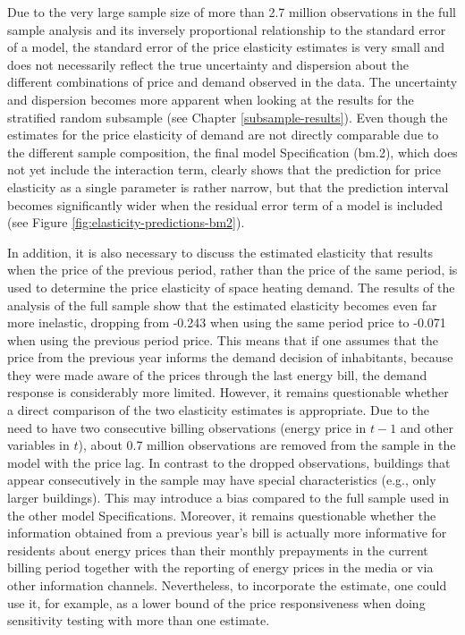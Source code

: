 \documentclass[12pt,twoside]{reedthesis}
\begin{document}
Due to the very large sample size of more than 2.7 million observations in the full sample analysis and its inversely proportional relationship to the standard error of a model, the standard error of the price elasticity estimates is very small and does not necessarily reflect the true uncertainty and dispersion about the different combinations of price and demand observed in the data. The uncertainty and dispersion becomes more apparent when looking at the results for the stratified random subsample (see Chapter \ref{subsample-results}). Even though the estimates for the price elasticity of demand are not directly comparable due to the different sample composition, the final model Specification (bm.2), which does not yet include the interaction term, clearly shows that the prediction for price elasticity as a single parameter is rather narrow, but that the prediction interval becomes significantly wider when the residual error term of a model is included (see Figure \ref{fig:elasticity-predictions-bm2}).

In addition, it is also necessary to discuss the estimated elasticity that results when the price of the previous period, rather than the price of the same period, is used to determine the price elasticity of space heating demand. The results of the analysis of the full sample show that the estimated elasticity becomes even far more inelastic, dropping from -0.243 when using the same period price to -0.071 when using the previous period price. This means that if one assumes that the price from the previous year informs the demand decision of inhabitants, because they were made aware of the prices through the last energy bill, the demand response is considerably more limited. However, it remains questionable whether a direct comparison of the two elasticity estimates is appropriate. Due to the need to have two consecutive billing observations (energy price in \(t-1\) and other variables in \(t\)), about 0.7 million observations are removed from the sample in the model with the price lag. In contrast to the dropped observations, buildings that appear consecutively in the sample may have special characteristics (e.g., only larger buildings). This may introduce a bias compared to the full sample used in the other model Specifications. Moreover, it remains questionable whether the information obtained from a previous year's bill is actually more informative for residents about energy prices than their monthly prepayments in the current billing period together with the reporting of energy prices in the media or via other information channels. Nevertheless, to incorporate the estimate, one could use it, for example, as a lower bound of the price responsiveness when doing sensitivity testing with more than one estimate.
\end{document}

